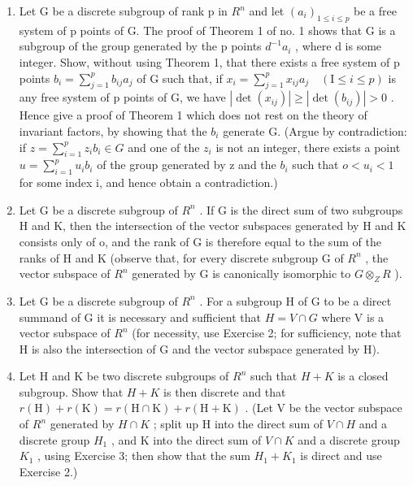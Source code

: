 \ExerciseGroupsStart
\ExerciseSection

\begin{enumerate}
\def\labelenumi{\arabic{enumi})}
\item
  Let G be a discrete subgroup of rank p in \(R^{n}\) and let \((a_{i})_{1\leqslant i\leqslant p}\) be a free system of p points of G. The proof of Theorem 1 of no. 1 shows that G is a subgroup of the group generated by the p points \(d^{-1}a_{i}\) , where d is some integer. Show, without using Theorem 1, that there exists a free system of p points \(b_{i}=\sum_{j=1}^{p}b_{ij}a_{j}\) of G such that, if \(x_{i}=\sum_{j=1}^{p}x_{ij}a_{j}\quad(\mathrm{I}\leqslant i\leqslant p)\) is any free system of p points of G, we have \(|\det(x_{ij})|\geqslant|\det(b_{ij})|>0\) . Hence give a proof of Theorem 1 which does not rest on the theory of invariant factors, by showing that the \(b_{i}\) generate G. (Argue by contradiction: if \(z=\sum_{i=1}^{p}z_{i}b_{i}\in G\) and one of the \(z_{i}\) is not an integer, there exists a point \(u=\sum_{i=1}^{p}u_{i}b_{i}\) of the group generated by z and the \(b_{i}\) such that \(o<u_{i}<1\) for some index i, and hence obtain a contradiction.)
\item
  Let G be a discrete subgroup of \(R^{n}\) . If G is the direct sum of two subgroups H and K, then the intersection of the vector subspaces generated by H and K consists only of o, and the rank of G is therefore equal to the sum of the ranks of H and K (observe that, for every discrete subgroup G of \(R^{n}\) , the vector subspace of \(R^{n}\) generated by G is canonically isomorphic to \(G \otimes_{Z} R\) ).
\item
  Let G be a discrete subgroup of \(R^{n}\) . For a subgroup H of G to be a direct summand of G it is necessary and sufficient that \(H = V \cap G\) where V is a vector subspace of \(R^{n}\) (for necessity, use Exercise 2; for sufficiency, note that H is also the intersection of G and the vector subspace generated by H).
\item
  Let H and K be two discrete subgroups of \(R^{n}\) such that \(H + K\) is a closed subgroup. Show that \(H + K\) is then discrete and that \(r(\mathrm{H}) + r(\mathrm{K}) = r(\mathrm{H} \cap \mathrm{K}) + r(\mathrm{H} + \mathrm{K})\) . (Let V be the vector subspace of \(R^{n}\) generated by \(H \cap K\) ; split up H into the direct sum of \(V \cap H\) and a discrete group \(H_{1}\) , and K into the direct sum of \(V \cap K\) and a discrete group \(K_{1}\) , using Exercise 3; then show that the sum \(H_{1} + K_{1}\) is direct and use Exercise 2.)

\end{enumerate}

